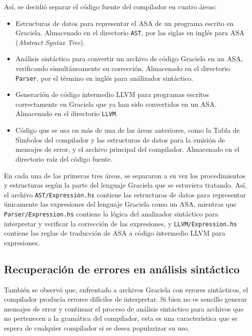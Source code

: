 Así, se decidió separar el código fuente del compilador en cuatro áreas:
\begin{itemize}

  \item Estructuras de datos para representar el \textsc{ASA} de un programa
  escrito en Graciela. Almacenado en el directorio \texttt{AST}, por las siglas
  en inglés para \textsc{ASA} (\emph{Abstract Syntax Tree}).

  \item Análisis sintáctico para convertir un archivo de código Graciela en un
  ASA, verificando simultáneamente su corrección. Almacenado en el directorio
  \texttt{Parser}, por el término en inglés para análizador sintáctico.

  \item Generación de código intermedio LLVM para programas escritos
  correctamente en Graciela que ya han sido convertidos en un ASA. Almacenado en el
  directorio \texttt{LLVM}.

  \item Código que se usa en más de una de las áreas anteriores, como la Tabla
  de Símbolos del compilador y las estructuras de datos para la emisión de
  mensajes de error, y el archivo principal del compilador. Almacenado en el
  directorio raíz del código fuente.

\end{itemize}

En cada una de las primeras tres áreas, se separaron a su vez los procedimientos
y estructuras según la parte del lenguaje Graciela que se estuviera tratando.
Así, el archivo \texttt{AST/Expression.hs} contiene las estructuras de datos
para representar únicamente las expresiones del lenguaje Graciela como un
\textsc{ASA}, mientras que \texttt{Parser/Expression.hs} contiene la lógica del
analizador sintáctico para interpretar y verificar la corrección de las
expresiones, y \texttt{LLVM/Expression.hs} contiene las reglas de traducción de
\textsc{ASA} a código intermedio \textsc{LLVM} para expresiones.

\subsection{Recuperación de errores en análisis sintáctico}

También se observó que, enfrentado a archivos Graciela con errores sintácticos,
el compilador producía errores difíciles de interpretar. Si bien no es sencillo
generar mensajes de error y continuar el proceso de análisis sintáctico para
archivos que no pertenecen a la gramática del compilador, esta es una
característica que se espera de cualquier compilador si se desea popularizar su
uso.

